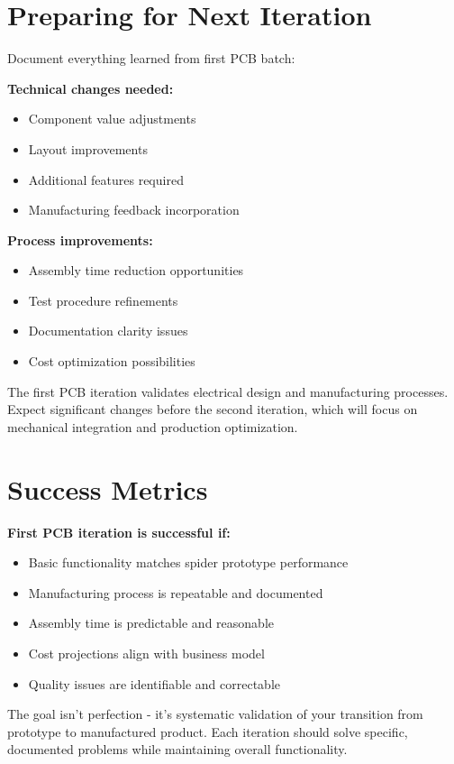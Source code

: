 \section{Preparing for Next Iteration}

Document everything learned from first PCB batch:

\textbf{Technical changes needed:}
\begin{itemize}
\item Component value adjustments
\item Layout improvements
\item Additional features required
\item Manufacturing feedback incorporation
\end{itemize}

\textbf{Process improvements:}
\begin{itemize}
\item Assembly time reduction opportunities
\item Test procedure refinements
\item Documentation clarity issues
\item Cost optimization possibilities
\end{itemize}

The first PCB iteration validates electrical design and manufacturing processes. Expect significant changes before the second iteration, which will focus on mechanical integration and production optimization.

\section{Success Metrics}

\textbf{First PCB iteration is successful if:}
\begin{itemize}
\item Basic functionality matches spider prototype performance
\item Manufacturing process is repeatable and documented
\item Assembly time is predictable and reasonable
\item Cost projections align with business model
\item Quality issues are identifiable and correctable
\end{itemize}

The goal isn't perfection - it's systematic validation of your transition from prototype to manufactured product. Each iteration should solve specific, documented problems while maintaining overall functionality.